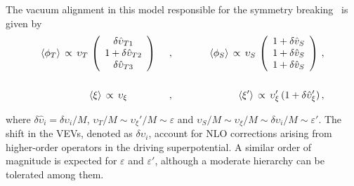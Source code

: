 \documentclass[a4paper,11pt]{article}
\newcommand{\bea}{\begin{eqnarray}}
\newcommand{\eea}{\end{eqnarray}}
\newcommand{\vep}{\varepsilon}
\newcommand{\nn}{\nonumber}
\begin{document}
The vacuum alignment in this model responsible for the symmetry breaking~\cite{Altarelli:2009kr} is given by
\bea 
\label{eqn:A4vevs}
 	\langle\phi_T\rangle \,\propto\,  \upsilon_T\, \left(\begin{array}{c} \delta  \hat\upsilon_{T1} \\ 1+\delta  \hat \upsilon_{T2}\\\delta  \hat\upsilon_{T3}\end{array} \right) \hspace{0.5cm}&,&\hspace{1cm} \nn
	\langle\phi_S\rangle \,\propto\, \upsilon_S\, \left(\begin{array}{c} 1+\delta  \hat v_{S} \\ 1+\delta \hat v_{S}\\1+\delta  \hat v_{S} \end{array} \right) \, ,\\\\ \nn
	\langle\xi\rangle \,\propto\, \upsilon_\xi \hspace{1.5cm}&,&\hspace{1cm}
 	\langle\xi'\rangle \,\propto\, \upsilon_\xi '\,(1+\delta \hat \upsilon'_{\xi})\, ,
\eea

where $\delta \hat \upsilon_{i}= \delta \upsilon_{i}/M$, $\upsilon_T/M\sim \upsilon_\xi '/M\sim\vep$ and $\upsilon_S/M\sim \upsilon_\xi /M\sim \delta \upsilon_{i}/M\sim \vep'$. The shift in the VEVs, denoted as $\delta\upsilon_{i}$, account for NLO corrections arising from higher-order operators in the driving superpotential. A similar order of magnitude is expected for $\vep$ and $\vep'$, although a moderate hierarchy can be tolerated among them. 
\end{document}
